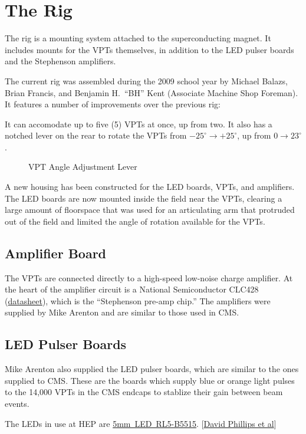 
\chapter{The Rig}
\label{sec:eq_rig}

The rig is a mounting system attached to the superconducting magnet.  It includes mounts for the VPTs themselves, in addition to the LED pulser boards and the Stephenson amplifiers.

The current rig was assembled during the 2009 school year by Michael Balazs, Brian Francis, and Benjamin H.\ ``BH'' Kent (Associate Machine Shop Foreman).  It features a number of improvements over the previous rig:

It can accomodate up to five (5) VPTs at once, up from two.  It also has a notched lever on the rear to rotate the VPTs from $-25^\circ \to +25^\circ$, up from $0 \to 23^\circ$.

\begin{figure}[hbp]
  \centering
  \caption{VPT Angle Adjustment Lever}
  \label{fig:eq_rig:angle}
\end{figure}

A new housing has been constructed for the LED boards, VPTs, and amplifiers.  The LED boards are now mounted inside the field near the VPTs, clearing a large amount of floorspace that was used for an articulating arm that protruded out of the field and limited the angle of rotation available for the VPTs.



\section{Amplifier Board}
\label{sec:eq_preamp}

The \glspl{VPT} are connected directly to a high-speed low-noise charge amplifier.  At the heart of the amplifier circuit is a {National Semiconductor CLC428} (\href{papers/CLC428}{datasheet}), which is the ``Stephenson pre-amp chip.''  The amplifiers were supplied by Mike Arenton and are similar to those used in CMS.


\section{LED Pulser Boards}
\label{sec:eq_led}

Mike Arenton also supplied the LED pulser boards, which are similar to the ones supplied to CMS.  These are the boards which supply blue or orange light pulses to the 14,000 VPTs in the CMS endcaps to stablize their gain between beam events.

The LEDs in use at HEP are \href{http://www.superbrightleds.com/cgi-bin/store/index.cgi?action=DispPage\&Page2Disp=/specs/b2\_specs.htm}{5mm~LED~RL5-B5515}. [\href{papers/newvptpaper}{David Phillips et al}]



